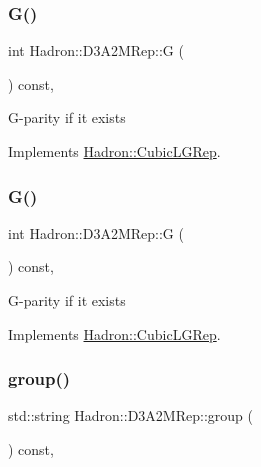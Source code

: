 \subsubsection{\texorpdfstring{G()}{G()}\hspace{0.1cm}{\footnotesize\ttfamily [2/3]}}
{\footnotesize\ttfamily int Hadron\+::\+D3\+A2\+M\+Rep\+::G (\begin{DoxyParamCaption}{ }\end{DoxyParamCaption}) const\hspace{0.3cm}{\ttfamily [inline]}, {\ttfamily [virtual]}}

G-\/parity if it exists 

Implements \mbox{\hyperlink{structHadron_1_1CubicLGRep_ace26f7b2d55e3a668a14cb9026da5231}{Hadron\+::\+Cubic\+L\+G\+Rep}}.

\mbox{\label{structHadron_1_1D3A2MRep_aba5bc123585e4308b60da9a6a0077fea}} 
\subsubsection{\texorpdfstring{G()}{G()}\hspace{0.1cm}{\footnotesize\ttfamily [3/3]}}
{\footnotesize\ttfamily int Hadron\+::\+D3\+A2\+M\+Rep\+::G (\begin{DoxyParamCaption}{ }\end{DoxyParamCaption}) const\hspace{0.3cm}{\ttfamily [inline]}, {\ttfamily [virtual]}}

G-\/parity if it exists 

Implements \mbox{\hyperlink{structHadron_1_1CubicLGRep_ace26f7b2d55e3a668a14cb9026da5231}{Hadron\+::\+Cubic\+L\+G\+Rep}}.

\mbox{\label{structHadron_1_1D3A2MRep_a8f43a2bae307e4f79549d0ca2e15e90d}} 
\subsubsection{\texorpdfstring{group()}{group()}\hspace{0.1cm}{\footnotesize\ttfamily [1/3]}}
{\footnotesize\ttfamily std\+::string Hadron\+::\+D3\+A2\+M\+Rep\+::group (\begin{DoxyParamCaption}{ }\end{DoxyParamCaption}) const\hspace{0.3cm}{\ttfamily [inline]}, {\ttfamily [virtual]}}

